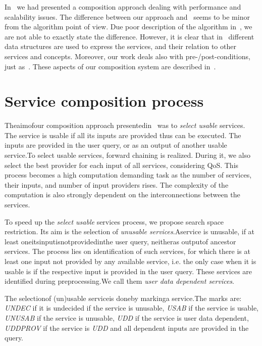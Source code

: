 \documentclass{llncs}
\begin{document}
In~\cite{5} we had presented a composition approach dealing with performance and 
scalability issues. The difference between our approach and~\cite{9} seems to be minor 
from the algorithm point of view. Due poor description of the algorithm in~\cite{9}, we 
are not able to exactly state the difference. However, it is clear that in~\cite{9} different 
data structures are used to express the services, and their relation to other services 
and concepts. Moreover, our work deals also with pre-/post-conditions, just as~\cite{12}. 
These aspects of our composition system are described in~\cite{4,6}. 

\section{Service composition process }


Theaimofour composition approach presentedin~\cite{4} was to \textit{select usable} services. 
The service is usable if all its inputs are provided thus can be executed. The inputs 
are provided in the user query, or as an output of another usable service.To 
select usable services, forward chaining is realized. During it, we also select the 
best provider for each input of all services, considering QoS. This process becomes 
a high computation demanding task as the number of services, their inputs, and 
number of input providers rises. The complexity of the computation is also strongly 
dependent on the interconnections between the services. 

To speed up the \textit{select usable}  services process, we propose search space restriction. 
Its aim is the selection of \textit{ unusable services}.Aservice is unusable, if at least 
oneitsinputisnotprovidedinthe user query, neitheras outputof ancestor services. 
The process lies on identification of such services, for which there is at least one 
input not provided by any available service, i.e. the only case when it is usable is 
if the respective input is provided in the user query. These services are identified 
during preprocessing.We call them \textit{user data dependent services}. 

The selectionof (un)usable serviceis doneby markinga service.The marks are: 
\textit{UNDEC} if it is undecided if the service is unusable, \textit{USAB} if the service is usable, 
\textit{UNUSAB} if the service is unusable, \textit{UDD} if the service is user data dependent, 
\textit{UDDPROV} if the service is \textit{UDD} and all dependent inputs are provided in the query. 
\end{document}

